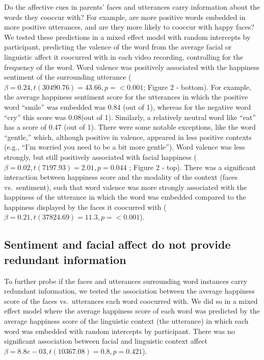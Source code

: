\documentclass[10pt, letterpaper]{article}
\begin{document}
Do the affective cues in parents' faces and utterances carry information
about the words they cooccur with? For example, are more positive words
embedded in more positive utterances, and are they more likely to
cooccur with happy faces? We tested these predictions in a mixed effect
model with random intercepts by participant, predicting the valence of
the word from the average facial or linguistic affect it coocurred with
in each video recording, controlling for the frequency of the word. Word
valence was positively associated with the happiness sentiment of the
surrounding utterance
(\(\beta = 0.24, \textit{t}(30490.76) = 43.66, \textit{p} = < 0.001\);
Figure 2 - bottom). For example, the average happiness sentiment score
for the utterances in which the positive word ``smile'' was embedded was
0.84 (out of 1), whereas for the negative word ``cry'' this score was
0.08(out of 1). Similarly, a relatively neutral word like ``eat'' has a
score of 0.47 (out of 1). There were some notable exceptions, like the
word ``gentle,'' which, although positive in valence, appeared in less
positive contexts (e.g., ``I'm worried you need to be a bit more
gentle''). Word valence was less strongly, but still positively
associated with facial happiness (
\(\beta = 0.02, \textit{t}(7197.93) = 2.01, \textit{p} = 0.044\) ;
Figure 2 - top). There was a significant interaction between happiness
score and the modality of the context (faces vs.~sentiment), such that
word valence was more strongly associated with the happiness of the
utterance in which the word was embedded compared to the happiness
displayed by the faces it coocurred with
(\(\beta = 0.21, \textit{t}(37824.69) = 11.3, \textit{p} = < 0.001\)).

\subsection{Sentiment and facial affect do not provide redundant
information}\label{sentiment-and-facial-affect-do-not-provide-redundant-information}

To further probe if the faces and utterances surrounding word instances
carry redundant information, we tested the association between the
average happiness score of the faces vs.~utterances each word coocurred
with. We did so in a mixed effect model where the average happiness
score of each word was predicted by the average happiness score of the
linguistic context (the utterance) in which each word was embedded with
random intercepts by participant. There was no significant association
between facial and linguistic context affect
\(\beta = 8.8e-03, \textit{t}(10367.08) = 0.8, \textit{p} = 0.421\)).
\end{document}
